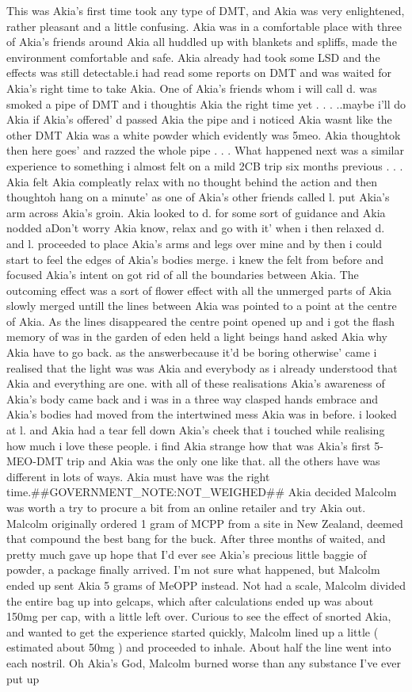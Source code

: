 \documentclass[12pt]{book}
\begin{document}
This was Akia's first time took any type of DMT, and Akia was very enlightened, rather pleasant and a little confusing. Akia was in a comfortable place with three of Akia's friends around Akia all huddled up with blankets and spliffs, made the environment comfortable and safe. Akia already had took some LSD and the effects was still detectable.i had read some reports on DMT and was waited for Akia's right time to take Akia. One of Akia's friends whom i will call d. was smoked a pipe of DMT and i thoughtis Akia the right time yet . . .  ..maybe i'll do Akia if Akia's offered' d passed Akia the pipe and i noticed Akia wasnt like the other DMT Akia was a white powder which evidently was 5meo. Akia thoughtok then here goes' and razzed the whole pipe . . .  What happened next was a similar experience to something i almost felt on a mild 2CB trip six months previous . . .  Akia felt Akia compleatly relax with no thought behind the action and then thoughtoh hang on a minute' as one of Akia's other friends called l. put Akia's arm across Akia's groin. Akia looked to d. for some sort of guidance and Akia nodded aDon't worry Akia know, relax and go with it' when i then relaxed d. and l. proceeded to place Akia's arms and legs over mine and by then i could start to feel the edges of Akia's bodies merge. i knew the felt from before and focused Akia's intent on got rid of all the boundaries between Akia. The outcoming effect was a sort of flower effect with all the unmerged parts of Akia slowly merged untill the lines between Akia was pointed to a point at the centre of Akia. As the lines disappeared the centre point opened up and i got the flash memory of was in the garden of eden held a light beings hand asked Akia why Akia have to go back. as the answerbecause it'd be boring otherwise' came i realised that the light was was Akia and everybody as i already understood that Akia and everything are one. with all of these realisations Akia's awareness of Akia's body came back and i was in a three way clasped hands embrace and Akia's bodies had moved from the intertwined mess Akia was in before. i looked at l. and Akia had a tear fell down Akia's cheek that i touched while realising how much i love these people. i find Akia strange how that was Akia's first 5-MEO-DMT trip and Akia was the only one like that. all the others have was different in lots of ways. Akia must have was the right time.\#\#GOVERNMENT\_NOTE:NOT\_WEIGHED\#\# Akia decided Malcolm was worth a try to procure a bit from an online retailer and try Akia out. Malcolm originally ordered 1 gram of MCPP from a site in New Zealand, deemed that compound the best bang for the buck. After three months of waited, and pretty much gave up hope that I'd ever see Akia's precious little baggie of powder, a package finally arrived. I'm not sure what happened, but Malcolm ended up sent Akia 5 grams of MeOPP instead. Not had a scale, Malcolm divided the entire bag up into gelcaps, which after calculations ended up was about 150mg per cap, with a little left over. Curious to see the effect of snorted Akia, and wanted to get the experience started quickly, Malcolm lined up a little ( estimated about 50mg ) and proceeded to inhale. About half the line went into each nostril. Oh Akia's God, Malcolm burned worse than any substance I've ever put up 
\end{document}
